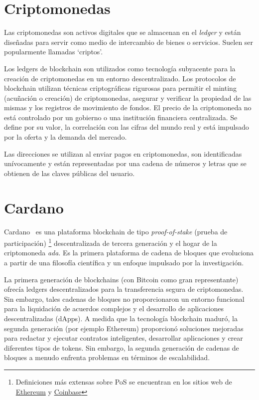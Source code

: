 \documentclass[12pt]{book}
\begin{document}
\section{Criptomonedas}

Las criptomonedas son activos digitales que se almacenan en el \textit{ledger} y están diseñadas para servir como medio de intercambio de bienes o servicios. Suelen ser popularmente llamadas `criptos'.

Los ledgers de blockchain son utilizados como tecnología subyacente para la creación de criptomonedas en un entorno descentralizado. Los protocolos de blockchain utilizan técnicas criptográficas rigurosas para permitir el minting (acuñación o creación) de criptomonedas, asegurar y verificar la propiedad de las mismas y los registros de movimiento de fondos. El precio de la criptomoneda no está controlado por un gobierno o una institución financiera centralizada. Se define por su valor, la correlación con las cifras del mundo real y está impulsado por la oferta y la demanda del mercado.

Las direcciones se utilizan al enviar pagos en criptomonedas, son identificadas unívocamente y están representadas por una cadena de números y letras que se obtienen de las claves públicas del usuario.

\section{Cardano}

Cardano~\cite{cardano_docs} es una plataforma blockchain de tipo \textit{proof-of-stake} (prueba de participación)
\footnote{Definiciones más extensas sobre PoS se encuentran en los sitios web de \href{https://ethereum.org/en/developers/docs/consensus-mechanisms/pos/}{Ethereum} y \href{https://www.coinbase.com/es/learn/crypto-basics/what-is-proof-of-work-or-proof-of-stake}{Coinbase}}
descentralizada de tercera generación y el hogar de la criptomoneda \textit{ada}. Es la primera plataforma de cadena de bloques que evoluciona a partir de una filosofía científica y un enfoque impulsado por la investigación.

La primera generación de blockchains (con Bitcoin como gran representante) ofrecía ledgers descentralizados para la transferencia segura de criptomonedas. Sin embargo, tales cadenas de bloques no proporcionaron un entorno funcional para la liquidación de acuerdos complejos y el desarrollo de aplicaciones descentralizadas (dApps). A medida que la tecnología blockchain maduró, la segunda generación (por ejemplo Ethereum) proporcionó soluciones mejoradas para redactar y ejecutar contratos inteligentes, desarrollar aplicaciones y crear diferentes tipos de tokens. Sin embargo, la segunda generación de cadenas de bloques a menudo enfrenta problemas en términos de escalabilidad.
\end{document}
